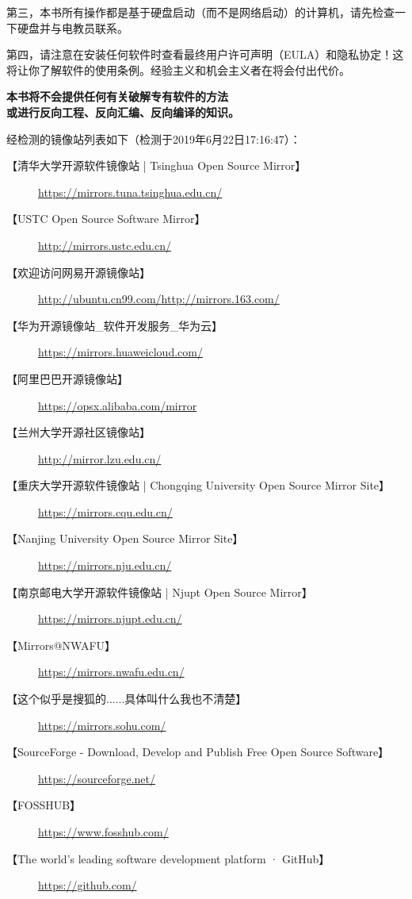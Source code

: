 第三，本书所有操作都是基于硬盘启动（而不是网络启动）的计算机，请先检查一下硬盘并与电教员联系。\par 
第四，请注意在安装任何软件时查看最终用户许可声明（EULA）和隐私协定！这将让你了解软件的使用条例。经验主义和机会主义者在将会付出代价。
\begin{center}\Large \bf {\color{red}本书将不会提供任何有关破解专有软件的方法\\或进行反向工程、反向汇编、反向编译的知识。}\normalall\end{center}
经检测的镜像站列表如下（检测于2019年6月22日17:16:47）：
\begin{description}
	\item [【清华大学开源软件镜像站 | Tsinghua Open Source Mirror】]\url{https://mirrors.tuna.tsinghua.edu.cn/}
	\item [【USTC Open Source Software Mirror】]\url{http://mirrors.ustc.edu.cn/}
	\item [【欢迎访问网易开源镜像站】]\url{http://ubuntu.cn99.com/}\url{http://mirrors.163.com/}
	\item [【华为开源镜像站\_软件开发服务\_华为云】]\url{https://mirrors.huaweicloud.com/}
	\item [【阿里巴巴开源镜像站】]\url{https://opsx.alibaba.com/mirror}
	\item [【兰州大学开源社区镜像站】]\url{http://mirror.lzu.edu.cn/}
	\item [【重庆大学开源软件镜像站 | Chongqing University Open Source Mirror Site】] \url{https://mirrors.cqu.edu.cn/}
	\item [【Nanjing University Open Source Mirror Site】] \url{https://mirrors.nju.edu.cn/}
	\item [【南京邮电大学开源软件镜像站 | Njupt Open Source Mirror】]\url{https://mirrors.njupt.edu.cn/}
	\item [【Mirrors@NWAFU】]\url{https://mirrors.nwafu.edu.cn/}
	\item [【这个似乎是搜狐的......具体叫什么我也不清楚】]\url{https://mirrors.sohu.com/}
	\item [【SourceForge - Download, Develop and Publish Free Open Source Software】] \url{https://sourceforge.net/}
	\item [【FOSSHUB】] \url{https://www.fosshub.com/}
	\item [【The world’s leading software development platform · GitHub】] \url{https://github.com/}
\end{description}
